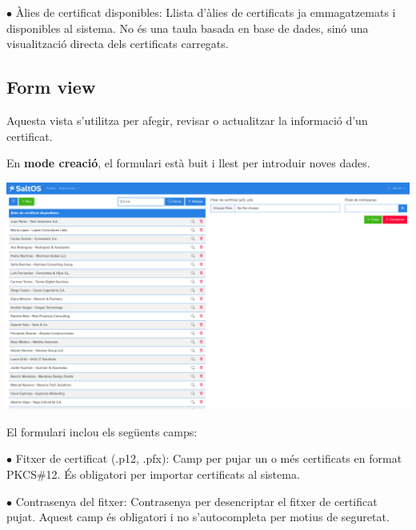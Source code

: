 \documentclass[a4paper]{article}
\begin{document}
\begin{compactitem}
\item[\color{myblue}$\bullet$] Àlies de certificat disponibles: Llista d'àlies de certificats ja emmagatzemats i disponibles al sistema. No és una taula basada en base de dades, sinó una visualització directa dels certificats carregats.
\end{compactitem}

\hypertarget{toc4}{}
\subsection{Form view}

Aquesta vista s'utilitza per afegir, revisar o actualitzar la informació d'un certificat.

En \textbf{mode creació}, el formulari està buit i llest per introduir noves dades.

\begin{center}\includegraphics[width=1\textwidth]{../ujest/snaps/test-screenshots-js-screenshots-certs-certs-create-ca-es-1-snap.png}\end{center}

El formulari inclou els següents camps:

\begin{compactitem}
\item[\color{myblue}$\bullet$] Fitxer de certificat (.p12, .pfx): Camp per pujar un o més certificats en format PKCS\#12. És obligatori per importar certificats al sistema.
\item[\color{myblue}$\bullet$] Contrasenya del fitxer: Contrasenya per desencriptar el fitxer de certificat pujat. Aquest camp és obligatori i no s'autocompleta per motius de seguretat.
\end{compactitem}
\end{document}
